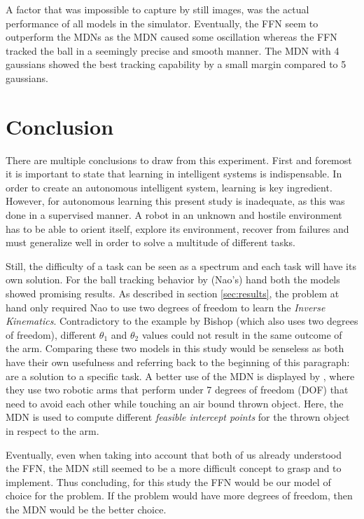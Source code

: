 \documentclass{article}
\begin{document}
    A factor that was impossible to capture by still images, was the actual performance of all models in the simulator.
    Eventually, the FFN seem to outperform the MDNs as the MDN caused some oscillation whereas the FFN tracked the ball in a seemingly precise and smooth manner.
    The MDN with 4 gaussians showed the best tracking capability by a small margin compared to 5 gaussians.

    \section{Conclusion}\label{sec:conclusion}
    There are multiple conclusions to draw from this experiment. First and foremost it is important to state that learning in intelligent systems is indispensable. 
    In order to create an autonomous intelligent system, learning is key ingredient. 
    However, for autonomous learning this present study is inadequate, as this was done in a supervised manner. 
    A robot in an unknown and hostile environment has to be able to orient itself, explore its environment, recover from failures and must generalize well in order to solve a multitude of different tasks\cite{thrun1995lifelong}. 
    
    Still, the difficulty of a task can be seen as a spectrum and each task will have its own solution. 
    For the ball tracking behavior by (Nao's) hand both the models showed promising results. 
    As described in section \ref{sec:results}, the problem at hand only required Nao to use two degrees of freedom to learn the \textit{Inverse Kinematics}.
    Contradictory to the example by Bishop\cite{bishop1994mixture} (which also uses two degrees of freedom), different $\theta_1$ and $\theta_2$ values could not result in the same outcome of the arm.
    Comparing these two models in this study would be senseless as both have their own usefulness and referring back to the beginning of this paragraph: are a solution to a specific task.
    A better use of the MDN is displayed by \cite{mirrazavi2018unified}, where they use two robotic arms that perform under 7 degrees of freedom (DOF) that need to avoid each other while touching an air bound thrown object.
    Here, the MDN is used to compute different \textit{feasible intercept points} for the thrown object in respect to the arm.

    Eventually, even when taking into account that both of us already understood the FFN, the MDN still seemed to be a more difficult concept to grasp and to implement.
    Thus concluding, for this study the FFN would be our model of choice for the problem.
    If the problem would have more degrees of freedom, then the MDN would be the better choice.




    \pagebreak
    
    
\end{document}
